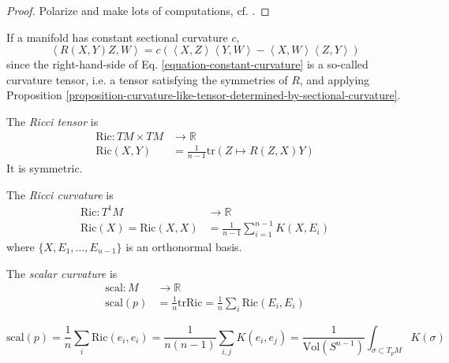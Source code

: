 \begin{proof}
Polarize and make lots of computations, cf. \cite{doc}.
\end{proof}

If a manifold has constant sectional curvature $c$,
\begin{equation}
\label{equation-constant-curvature}
\left<R(X,Y)Z,W\right>=
c(\left<X,Z\right>\left<Y,W\right>-\left<X,W\right>\left<Z,Y\right>)
\end{equation}
since the right-hand-side of Eq. \ref{equation-constant-curvature} is a
so-called curvature tensor, i.e. a tensor satisfying the symmetries of $R$, and
applying Proposition 
\ref{proposition-curvature-like-tensor-determined-by-sectional-curvature}.

The {\it Ricci tensor} is
\begin{equation}
\label{equation-Ricci-tensor}
\begin{aligned}
\text{Ric}: TM\times TM &\longrightarrow \mathbb{R} \\
\text{Ric}(X,Y)&=\frac{1}{n-1}\text{tr}(Z\mapsto R(Z,X)Y)
\end{aligned}
\end{equation}
It is symmetric.

The {\it Ricci curvature} is
\begin{equation}
\label{equation-Ricci-curvature}
\begin{aligned}
\text{Ric}: T^1M &\longrightarrow \mathbb{R} \\
\text{Ric}(X)=\text{Ric}(X,X)&=\frac{1}{n-1}\sum_{i=1}^{n-1}K(X,E_i)
\end{aligned}
\end{equation}
where $\{X,E_1,\ldots,E_{n-1}\}$ is an orthonormal basis.

The {\it scalar curvature} is
\begin{equation}
\label{equation-scalar-curvature}
\begin{aligned}
\text{scal}: M &\longrightarrow \mathbb{R} \\
\text{scal}(p)&=\frac{1}{n}\text{tr}\text{Ric}
=\frac{1}{n}\sum_i\text{Ric}(E_i,E_i)
\end{aligned}
\end{equation}

\begin{lemma}
\label{lemma-scalar-curvature-is-mean-of-sectional}
$$
\text{scal}(p)=\frac{1}{n}\sum_{i}\text{Ric}(e_i,e_i)
=\frac{1}{n(n-1)}\sum_{i,j}K(e_i,e_j)
=\frac{1}{\text{Vol}(S^{n-1})}\int_{\sigma\subset T_pM}K(\sigma)
$$
\end{lemma}

